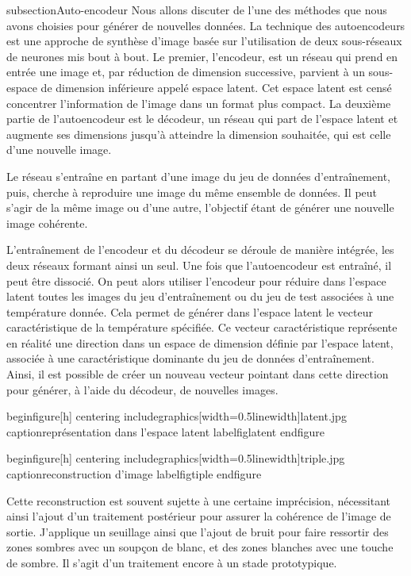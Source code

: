 subsection{Auto-encodeur}
Nous allons discuter de l'une des méthodes que nous avons choisies pour générer de nouvelles données. La technique des autoencodeurs est une approche de synthèse d'image basée sur l'utilisation de deux sous-réseaux de neurones mis bout à bout. Le premier, l'encodeur, est un réseau qui prend en entrée une image et, par réduction de dimension successive, parvient à un sous-espace de dimension inférieure appelé espace latent. Cet espace latent est censé concentrer l'information de l'image dans un format plus compact. La deuxième partie de l'autoencodeur est le décodeur, un réseau qui part de l'espace latent et augmente ses dimensions jusqu'à atteindre la dimension souhaitée, qui est celle d'une nouvelle image.

Le réseau s'entraîne en partant d'une image du jeu de données d'entraînement, puis, cherche à reproduire une image du même ensemble de données. Il peut s'agir de la même image ou d'une autre, l'objectif étant de générer une nouvelle image cohérente.

L'entraînement de l'encodeur et du décodeur se déroule de manière intégrée, les deux réseaux formant ainsi un seul. Une fois que l'autoencodeur est entraîné, il peut être dissocié. On peut alors utiliser l'encodeur pour réduire dans l'espace latent toutes les images du jeu d'entraînement ou du jeu de test associées à une température donnée. Cela permet de générer dans l'espace latent le vecteur caractéristique de la température spécifiée. Ce vecteur caractéristique représente en réalité une direction dans un espace de dimension définie par l'espace latent, associée à une caractéristique dominante du jeu de données d'entraînement. Ainsi, il est possible de créer un nouveau vecteur pointant dans cette direction pour générer, à l'aide du décodeur, de nouvelles images.

begin{figure}[h]
	centering
	includegraphics[width=0.5linewidth]{latent.jpg}
	caption{représentation dans l'espace latent}
	label{figlatent}
end{figure}


begin{figure}[h]
	centering
	includegraphics[width=0.5linewidth]{triple.jpg}
	caption{reconstruction d'image}
	label{figtiple}
end{figure}

Cette reconstruction est souvent sujette à une certaine imprécision, nécessitant ainsi l'ajout d'un traitement postérieur pour assurer la cohérence de l'image de sortie. J'applique un seuillage ainsi que l'ajout de bruit pour faire ressortir des zones sombres avec un soupçon de blanc, et des zones blanches avec une touche de sombre. Il s'agit d'un traitement encore à un stade prototypique.

